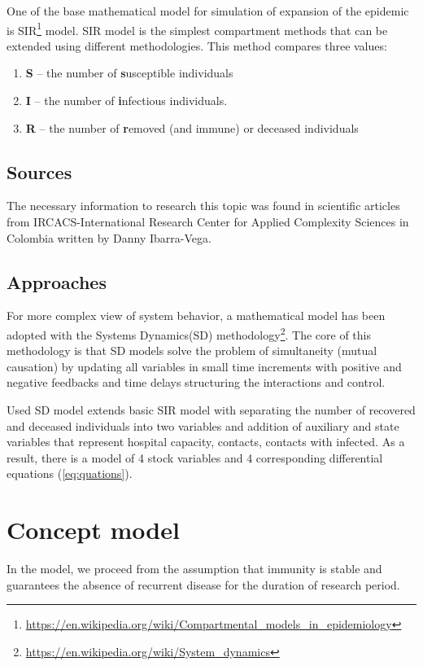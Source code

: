 \documentclass[12pt,a4paper,english]{article}
\begin{document}
    One of the base mathematical model for simulation of expansion of the epidemic is SIR\footnote{\href{https://en.wikipedia.org/wiki/Compartmental\_models\_in\_epidemiology}{https://en.wikipedia.org/wiki/Compartmental\_models\_in\_epidemiology}} model. 
    SIR model is the simplest compartment methods that can be extended using different methodologies.
    This method compares three values:
    \begin{enumerate}
        \item \textbf{S} -- the number of \textbf{s}usceptible individuals
        \item \textbf{I} -- the number of \textbf{i}nfectious individuals.
        \item \textbf{R} -- the number of \textbf{r}emoved (and immune) or deceased individuals
    \end{enumerate} 

    \subsection{Sources}
    The necessary information to research this topic was found in scientific articles from IRCACS-International Research Center for Applied Complexity Sciences in  Colombia written by Danny Ibarra-Vega\cite{math_article}.

    \subsection{Approaches}
    For more complex view of system behavior, a mathematical model has been adopted with the Systems Dynamics(SD) methodology\footnote{\href{https://en.wikipedia.org/wiki/System\_dynamics}{https://en.wikipedia.org/wiki/System\_dynamics}}.
    The core of this methodology is that SD models solve the problem of simultaneity (mutual causation) by updating all variables in small time increments with positive and negative feedbacks and time delays structuring the interactions and control.
    
    Used SD model extends basic SIR model with separating the number of recovered and deceased individuals into two variables and addition of auxiliary and state variables that represent hospital capacity, contacts, contacts with infected. 
    As a result, there is a model of 4 stock variables and 4 corresponding differential equations (\ref{eq:quations}).

    \section{Concept model} \label{conc_model}
    In the model, we proceed from the assumption that immunity is stable and guarantees the absence of recurrent disease for the duration of research period. 
    
\end{document}
